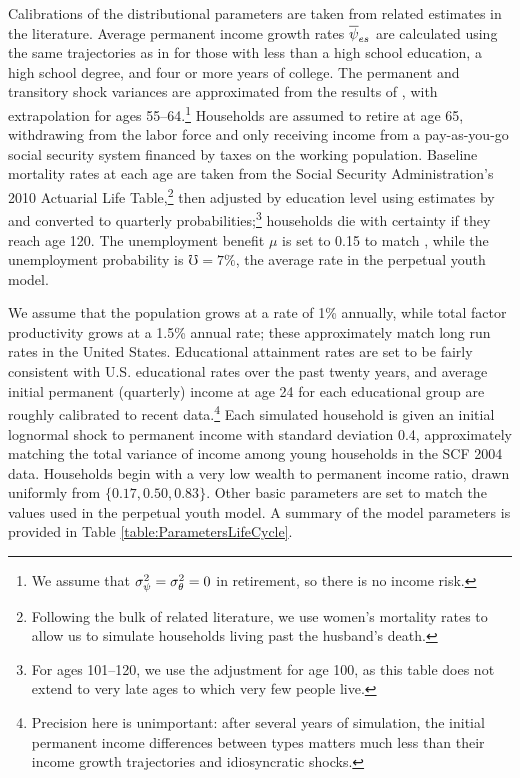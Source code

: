 \documentclass[12pt,titlepage]{econtex}
\renewcommand{\urate}{\ensuremath{\mho}}
\begin{document}
Calibrations of the distributional parameters are taken from related estimates in the literature.  Average permanent income growth rates $\overline{\psi}_{es}$ are calculated using the same trajectories as in \cite{Cagetti} for those with less than a high school education, a high school degree, and four or more years of college.  The permanent and transitory shock variances are approximated from the results of \cite{SabelhausSong}, with extrapolation for ages 55--64.\footnote{We assume that $\sigma^2_{\psi} = \sigma^2_{\theta} = 0$ in retirement, so there is no income risk.}  Households are assumed to retire at age 65, withdrawing from the labor force and only receiving income from a pay-as-you-go social security system financed by taxes on the working population.  Baseline mortality rates at each age are taken from the Social Security Administration's 2010 Actuarial Life Table,\footnote{Following the bulk of related literature, we use women's mortality rates to allow us to simulate households living past the husband's death.} then adjusted by education level using estimates by \cite{BrownLiebmanPollet} and converted to quarterly probabilities;\footnote{For ages 101--120, we use the adjustment for age 100, as this table does not extend to very late ages to which very few people live.} households die with certainty if they reach age 120.  The unemployment benefit $\mu$ is set to 0.15 to match \cite{Cagetti}, while the unemployment probability is $\urate = 7\%$, the average rate in the perpetual youth model.

We assume that the population grows at a rate of 1\% annually, while total factor productivity grows at a 1.5\% annual rate; these approximately match long run rates in the United States.  Educational attainment rates are set to be fairly consistent with U.S. educational rates over the past twenty years, and average initial permanent (quarterly) income at age 24 for each educational group are roughly calibrated to recent data.\footnote{Precision here is unimportant: after several years of simulation, the initial permanent income differences between types matters much less than their income growth trajectories and idiosyncratic shocks.}  Each simulated household is given an initial lognormal shock to permanent income with standard deviation 0.4, approximately matching the total variance of income among young households in the SCF 2004 data.  Households begin with a very low wealth to permanent income ratio, drawn uniformly from $\{0.17,0.50,0.83\}$.  Other basic parameters are set to match the values used in the perpetual youth model.  A summary of the model parameters is provided in Table \ref{table:ParametersLifeCycle}.
\end{document}
